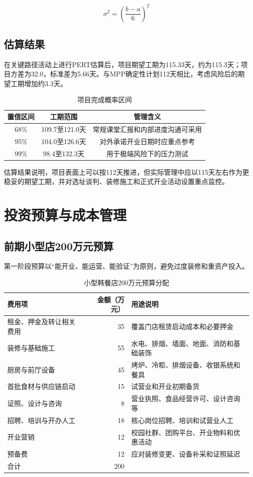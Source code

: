 \documentclass[UTF8,zihao=-4]{ctexart}
\begin{document}
\[
\sigma^2=\left(\frac{b-a}{6}\right)^2
\]

\subsection{估算结果}

在关键路径活动上进行PERT估算后，项目期望工期为115.33天，约为115.3天；项目方差为32.0，标准差为5.66天。与MPP确定性计划112天相比，考虑风险后的期望工期增加约3.3天。

\begin{table}[H]
  \centering
  \caption{项目完成概率区间}
  \begin{tabular}{ccc}
    \toprule
    置信区间 & 工期范围 & 管理含义 \\
    \midrule
    68\% & 109.7至121.0天 & 常规课堂汇报和内部进度沟通可采用 \\
    95\% & 104.0至126.6天 & 对外承诺开业日期时应重点参考 \\
    99\% & 98.4至132.3天 & 用于极端风险下的压力测试 \\
    \bottomrule
  \end{tabular}
\end{table}

估算结果说明，项目表面上可以按112天推进，但实际管理中应以115天左右作为更稳妥的期望工期，并对选址谈判、装修施工和正式开业活动设置重点监控。

\section{投资预算与成本管理}

\subsection{前期小型店200万元预算}

第一阶段预算以“能开业、能运营、能验证”为原则，避免过度装修和重资产投入。

\begin{table}[H]
  \centering
  \caption{小型韩餐店200万元预算分配}
  \begin{tabularx}{\textwidth}{p{4cm}rY}
    \toprule
    费用项 & 金额（万元） & 用途说明 \\
    \midrule
    租金、押金及转让相关费用 & 35 & 覆盖门店租赁启动成本和必要押金 \\
    装修与基础施工 & 55 & 水电、排烟、墙面、地面、消防和基础装饰 \\
    厨房与前厅设备 & 45 & 烤炉、冷柜、排烟设备、收银系统和餐具 \\
    首批食材与供应链启动 & 15 & 试营业和开业初期备货 \\
    证照、设计与咨询 & 8 & 营业执照、食品经营许可、设计咨询等 \\
    招聘、培训与开办人工 & 18 & 核心岗位招聘、培训和试营业人工 \\
    开业营销 & 12 & 校园社群、团购平台、开业物料和优惠活动 \\
    预备费 & 12 & 应对装修变更、设备补采和证照延迟 \\
    \midrule
    合计 & 200 &  \\
    \bottomrule
  \end{tabularx}
\end{table}
\end{document}
